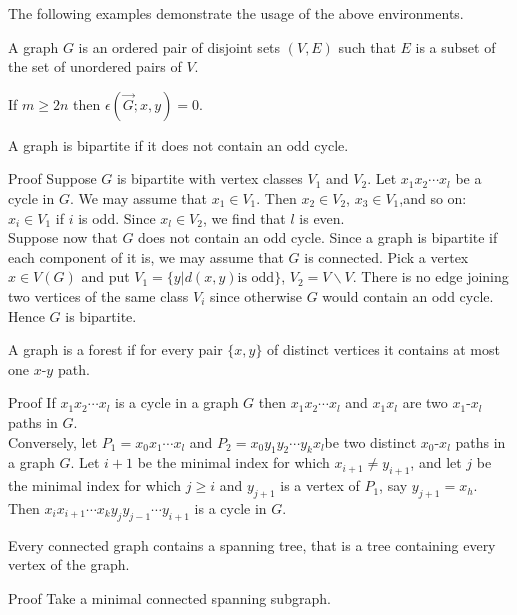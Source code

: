 \documentclass[print]{jicspack}
\begin{document}
The following examples demonstrate the usage of the above environments.
\begin{defn}
A graph $G$ is an ordered pair of disjoint sets $(V,E)$ such that $E$ is a subset of the set
of unordered pairs of $V$.
\end{defn}
\begin{lem}
If $m\geqslant 2n$ then $\epsilon(\overrightarrow{G};x,y)=0$.
\end{lem}


\begin{thm}
A graph is bipartite if it does not contain an odd cycle.
\end{thm}
\begin{pf*}{Proof}
Suppose $G$ is bipartite with vertex classes $V_1$ and $V_2$.
Let $x_1x_2\cdots x_l$ be a cycle in $G$.
We may assume that $x_1\in V_1$. Then $x_2\in V_2$, $x_3\in V_1$,and so on:
$x_i\in V_1$ if $i$ is odd.
Since $x_l\in V_2$, we find that $l$ is even.\\
\indent{}Suppose now that $G$ does not contain an odd cycle. Since a graph is bipartite if each component of it is,
we may assume that $G$ is connected. Pick a vertex $x\in V(G)$ and put $V_1=\{y| d(x,y)\mbox{is odd}\}$,
$V_2=V\backslash V$. There is no edge joining two vertices of the same class $V_i$ since otherwise $G$ would contain an odd cycle.
Hence $G$ is bipartite.
\end{pf*}
\begin{thm}
A graph is a forest if for every pair $\{x,y\}$ of distinct vertices it contains at most one $x$-$y$ path.
\end{thm}
\begin{pf*}{Proof}
If $x_1x_2\cdots x_l$ is a cycle in a graph $G$ then $x_1x_2\cdots x_l$ and $x_1x_l$ are two $x_1$-$x_l$ paths in $G$.\\
\indent{}Conversely, let $P_1=x_0x_1\cdots x_l$ and
$P_2=x_0y_1y_2\cdots y_kx_l$be two distinct $x_0$-$x_l$ paths in a
graph $G$. Let $i+1$ be the minimal index for which $x_{i+1}\neq
y_{i+1}$, and let $j$ be the minimal index for which $j\geqslant
i$ and $y_{j+1}$ is a vertex of $P_1$, say $y_{j+1}=x_h$. Then
$x_ix_{i+1}\cdots x_ky_jy_{j-1}\cdots y_{i+1}$ is a cycle in $G$.
\end{pf*}
\begin{col}
Every connected graph contains a spanning tree, that is a tree containing every vertex of the graph.
\end{col}
\begin{pf*}{Proof}
Take a minimal connected spanning subgraph.
\end{pf*}
\end{document}
